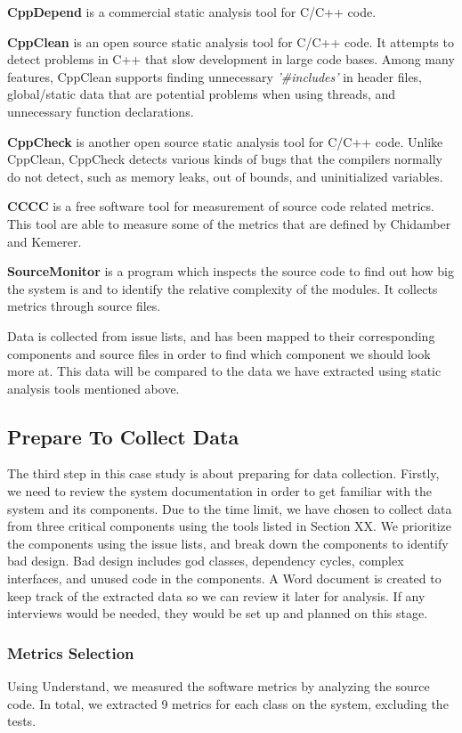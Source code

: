 \textbf{CppDepend} is a commercial static analysis tool for C/C++ code. 

\textbf{CppClean} is an open source static analysis tool for C/C++ code. It attempts to detect problems in C++ that slow development in large code bases. Among many features, CppClean supports finding unnecessary \textit{'\#includes'} in header files, global/static data that are potential problems when using threads, and unnecessary function declarations.

\textbf{CppCheck} is another open source static analysis tool for C/C++ code. Unlike CppClean, CppCheck detects various kinds of bugs that the compilers normally do not detect, such as memory leaks, out of bounds, and uninitialized variables.

\textbf{CCCC} is a free software tool for measurement of source code related metrics. This tool are able to measure some of the metrics that are defined by Chidamber and Kemerer\cite{chidamber1994metrics}.

\textbf{SourceMonitor} is a program which inspects the source code to find out how big the system is and to identify the relative complexity of the modules. It collects metrics through source files.

Data is collected from issue lists, and has been mapped to their corresponding components and source files in order to find which component we should look more at. This data will be compared to the data we have extracted using static analysis tools mentioned above.


\subsection{Prepare To Collect Data}
The third step in this case study is about preparing for data collection. Firstly, we need to review the system documentation in order to get familiar with the system and its components. Due to the time limit, we have chosen to collect data from three critical components using the tools listed in Section XX. We prioritize the components using the issue lists, and break down the components to identify bad design. Bad design includes god classes, dependency cycles, complex interfaces, and unused code in the components. A Word document is created to keep track of the extracted data so we can review it later for analysis. If any interviews would be needed, they would be set up and planned on this stage. 


\subsubsection{Metrics Selection}
Using Understand, we measured the software metrics by analyzing the source code. In total, we extracted 9 metrics for each class on the system, excluding the tests.

